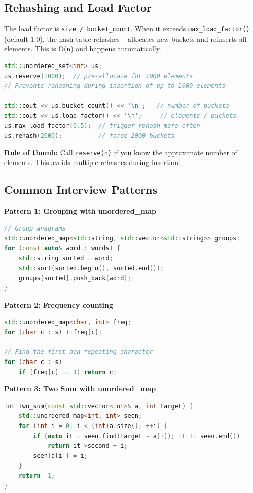 \subsection{Rehashing and Load Factor}

The load factor is \texttt{size / bucket\_count}. When it exceeds \texttt{max\_load\_factor()} (default 1.0), the hash table rehashes -- allocates new buckets and reinserts all elements. This is O(n) and happens automatically.

\begin{lstlisting}[language=C++]
std::unordered_set<int> us;
us.reserve(1000);  // pre-allocate for 1000 elements
// Prevents rehashing during insertion of up to 1000 elements

std::cout << us.bucket_count() << '\n';   // number of buckets
std::cout << us.load_factor() << '\n';     // elements / buckets
us.max_load_factor(0.5);  // trigger rehash more often
us.rehash(2000);          // force 2000 buckets
\end{lstlisting}

\textbf{Rule of thumb:} Call \texttt{reserve(n)} if you know the approximate number of elements. This avoids multiple rehashes during insertion.

\subsection{Common Interview Patterns}

\textbf{Pattern 1: Grouping with unordered\_map}
\begin{lstlisting}[language=C++]
// Group anagrams
std::unordered_map<std::string, std::vector<std::string>> groups;
for (const auto& word : words) {
    std::string sorted = word;
    std::sort(sorted.begin(), sorted.end());
    groups[sorted].push_back(word);
}
\end{lstlisting}

\textbf{Pattern 2: Frequency counting}
\begin{lstlisting}[language=C++]
std::unordered_map<char, int> freq;
for (char c : s) ++freq[c];

// Find the first non-repeating character
for (char c : s)
    if (freq[c] == 1) return c;
\end{lstlisting}

\textbf{Pattern 3: Two Sum with unordered\_map}
\begin{lstlisting}[language=C++]
int two_sum(const std::vector<int>& a, int target) {
    std::unordered_map<int, int> seen;
    for (int i = 0; i < (int)a.size(); ++i) {
        if (auto it = seen.find(target - a[i]); it != seen.end())
            return it->second + i;
        seen[a[i]] = i;
    }
    return -1;
}
\end{lstlisting}

